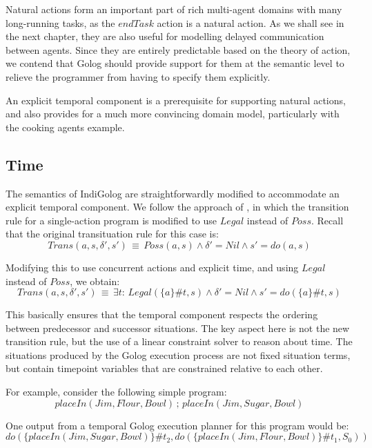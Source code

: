 Natural actions form an important part of rich multi-agent domains
with many long-running tasks, as the $endTask$ action is a natural
action. As we shall see in the next chapter, they are also useful
for modelling delayed communication between agents. Since they are
entirely predictable based on the theory of action, we contend that
Golog should provide support for them at the semantic level to relieve
the programmer from having to specify them explicitly.

An explicit temporal component is a prerequisite for supporting natural
actions, and also provides for a much more convincing domain model,
particularly with the cooking agents example.


\subsection{Time}

The semantics of IndiGolog are straightforwardly modified to accommodate
an explicit temporal component. We follow the approach of \citep{Reiter98seq_temp_golog,reiter01kia},
in which the transition rule for a single-action program is modified
to use $Legal$ instead of $Poss$. Recall that the original transituation
rule for this case is:\[
Trans(a,s,\delta',s')\,\equiv\, Poss(a,s)\wedge\delta'=Nil\wedge s'=do(a,s)\]


Modifying this to use concurrent actions and explicit time, and using
$Legal$ instead of $Poss$, we obtain:\begin{equation}
Trans(a,s,\delta',s')\,\equiv\,\exists t:\, Legal(\{a\}\#t,s)\wedge\delta'=Nil\wedge s'=do(\{a\}\#t,s)\label{eq:MIndiGolog:temp_trans_a}\end{equation}


This basically ensures that the temporal component respects the ordering
between predecessor and successor situations. The key aspect here
is not the new transition rule, but the use of a linear constraint
solver to reason about time. The situations produced by the Golog
execution process are not fixed situation terms, but contain timepoint
variables that are constrained relative to each other.

For example, consider the following simple program:\[
placeIn(Jim,Flour,Bowl)\,;\, placeIn(Jim,Sugar,Bowl)\]


One output from a temporal Golog execution planner for this program
would be:\[
do(\{placeIn(Jim,Sugar,Bowl)\}\#t_{2},do(\{placeIn(Jim,Flour,Bowl)\}\#t_{1},S_{0}))\]



